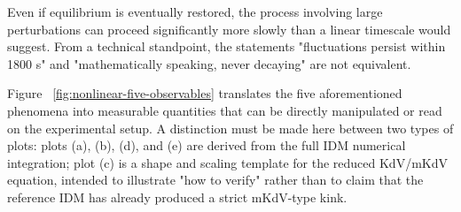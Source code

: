 \documentclass[11pt,a4paper,openany]{book}
\numberwithin{equation}{chapter}
\numberwithin{figure}{chapter}
\numberwithin{table}{chapter}
\begin{document}
\begin{description}[style=unboxed,leftmargin=0pt,labelindent=0pt,labelsep=0.5em,itemsep=0.65em,font=\normalfont\bfseries\color{navy}]
\item[Amplitude dependence of recovery time]









Even if equilibrium is eventually restored, the process involving large perturbations can proceed significantly more slowly than a linear timescale would suggest. From a technical standpoint, the statements "fluctuations persist within 1800 s" and "mathematically speaking, never decaying" are not equivalent.




\end{description}







Figure ~\ref{fig:nonlinear-five-observables} translates the five aforementioned phenomena into measurable quantities that can be directly manipulated or read on the experimental setup. A distinction must be made here between two types of plots: plots (a), (b), (d), and (e) are derived from the full IDM numerical integration; plot (c) is a shape and scaling template for the reduced KdV/mKdV equation, intended to illustrate "how to verify" rather than to claim that the reference IDM has already produced a strict mKdV-type kink.
\end{document}
